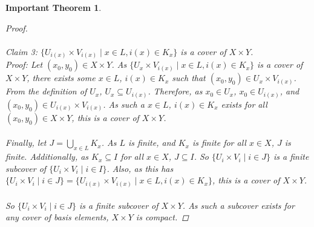 \documentclass[11pt]{article}
\newtheorem{theorem}{Important Theorem}
\begin{document}
\begin{theorem}
\begin{proof}
\\
\\
Claim 3: $\{U_{i(x)} \times V_{i(x)} \mid x \in L, i(x) \in K_x\}$ is a cover of $X \times Y$.
\\
Proof: Let $(x_0,y_0) \in X \times Y$.  As $\{U_x \times V_{i(x)} \mid x \in L, i(x) \in K_x\}$ is a cover of $X \times Y$, there exists some $x \in L$, $i(x) \in K_x$ such that $(x_0,y_0) \in U_x \times V_{i(x)}$.  From the definition of $U_x$, $U_x \subseteq U_{i(x)}$.  Therefore, as $x_0 \in U_x$, $x_0 \in U_{i(x)}$, and $(x_0, y_0) \in U_{i(x)} \times V_{i(x)}$.  As such a $x \in L$, $i(x) \in K_x$ exists for all $(x_0, y_0) \in X \times Y$, this is a cover of $X \times Y$.  
\\
\\
Finally, let $J = \bigcup_{x \in L} K_x$.  As $L$ is finite, and $K_x$ is finite for all $x \in X$, $J$ is finite.  Additionally, as $K_x \subseteq I$ for all $x \in X$, $J \subseteq I$.  So $\{U_i \times V_i \mid i \in J\}$ is a finite subcover of $\{U_i \times V_i \mid i \in I\}$.  Also, as this has $\{U_i \times V_i \mid i \in J\} = \{U_{i(x)} \times V_{i(x)} \mid x \in L, i(x) \in K_x\}$, this is a cover of $X \times Y$.
\\
\\
So $\{U_i \times V_i \mid i \in J\}$ is a finite subcover of $X \times Y$.  As such a subcover exists for any cover of basis elements, $X \times Y$ is compact.
\end{proof}
\end{theorem}
\end{document}
